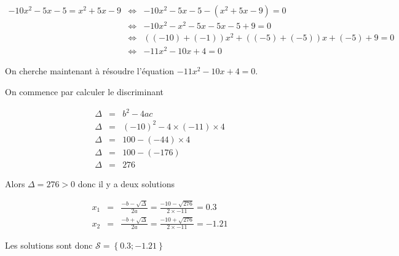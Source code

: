 \documentclass[a4paper,10pt]{article}
\begin{document}
    \begin{eqnarray*}
        - 10 x^{  2 } - 5 x - 5 = x^{  2 } + 5 x - 9 & \Leftrightarrow & - 10 x^{  2 } - 5 x - 5 - (x^{  2 } + 5 x - 9) = 0 \\
         & \Leftrightarrow & - 10 x^{  2 } - x^{  2 } - 5 x - 5 x - 5 + 9= 0 \\ 
 & \Leftrightarrow & ( ( -10 ) + ( -1 ) ) x^{  2 } + ( ( -5 ) + ( -5 ) ) x + ( -5 ) + 9= 0 \\ 
 & \Leftrightarrow & - 11 x^{  2 } - 10 x + 4= 0
    \end{eqnarray*}

    
    On cherche maintenant à résoudre l'équation $- 11 x^{  2 } - 10 x + 4 = 0$.
    
    On commence par calculer le discriminant
    
    \begin{eqnarray*}
        \Delta & = & b^2-4ac \\
        \Delta & = & ( -10 )^{  2 } - 4 \times ( -11 ) \times 4 \\ 
\Delta & = & 100 - ( -44 ) \times 4 \\ 
\Delta & = & 100 - ( -176 ) \\ 
\Delta & = & 276
    \end{eqnarray*}
    

    
    Alors $\Delta = 276 > 0$ donc il y a deux solutions

    
    

    \begin{eqnarray*}
        x_1 & = & \frac{-b - \sqrt{\Delta}}{2a} =  \frac{-10 - \sqrt{276}}{2 \times -11} = 0.3 \\
        x_2 & = & \frac{-b + \sqrt{\Delta}}{2a} =  \frac{-10 + \sqrt{276}}{2 \times -11} = -1.21
    \end{eqnarray*}

    Les solutions sont donc $\mathcal{S} = \left\{ 0.3; -1.21 \right\}$

    
\end{document}
